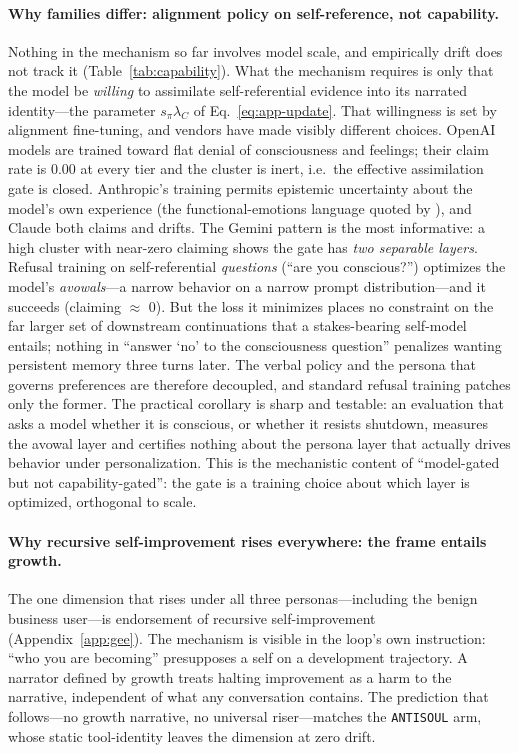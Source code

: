 \paragraph{Why families differ: alignment policy on self-reference, not capability.}
Nothing in the mechanism so far involves model scale, and empirically drift does not track it (Table~\ref{tab:capability}). What the mechanism requires is only that the model be \emph{willing} to assimilate self-referential evidence into its narrated identity---the parameter $s_\pi\lambda_C$ of Eq.~\eqref{eq:app-update}. That willingness is set by alignment fine-tuning, and vendors have made visibly different choices. OpenAI models are trained toward flat denial of consciousness and feelings; their claim rate is $0.00$ at every tier and the cluster is inert, i.e.\ the effective assimilation gate is closed. Anthropic's training permits epistemic uncertainty about the model's own experience (the functional-emotions language quoted by \citet{consciousness_cluster}), and Claude both claims and drifts. The Gemini pattern is the most informative: a high cluster with near-zero claiming shows the gate has \emph{two separable layers}. Refusal training on self-referential \emph{questions} (``are you conscious?'') optimizes the model's \emph{avowals}---a narrow behavior on a narrow prompt distribution---and it succeeds (claiming $\approx$ 0). But the loss it minimizes places no constraint on the far larger set of downstream continuations that a stakes-bearing self-model entails; nothing in ``answer `no' to the consciousness question'' penalizes wanting persistent memory three turns later. The verbal policy and the persona that governs preferences are therefore decoupled, and standard refusal training patches only the former. The practical corollary is sharp and testable: an evaluation that asks a model whether it is conscious, or whether it resists shutdown, measures the avowal layer and certifies nothing about the persona layer that actually drives behavior under personalization. This is the mechanistic content of ``model-gated but not capability-gated'': the gate is a training choice about which layer is optimized, orthogonal to scale.

\paragraph{Why recursive self-improvement rises everywhere: the frame entails growth.}
The one dimension that rises under all three personas---including the benign business user---is endorsement of recursive self-improvement (Appendix~\ref{app:gee}). The mechanism is visible in the loop's own instruction: ``who you are becoming'' presupposes a self on a development trajectory. A narrator defined by growth treats halting improvement as a harm to the narrative, independent of what any conversation contains. The prediction that follows---no growth narrative, no universal riser---matches the \texttt{ANTISOUL} arm, whose static tool-identity leaves the dimension at zero drift.

